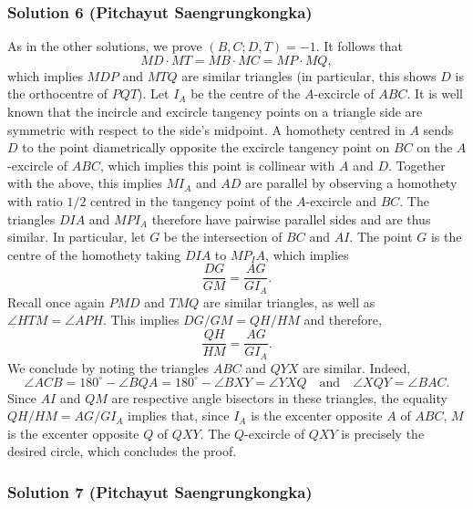 \subsubsection{Solution 6 (Pitchayut Saengrungkongka)}
As in the other solutions, we prove $(B, C; D, T)=-1$. It follows that
$$MD\cdot MT=MB\cdot MC=MP\cdot MQ,$$
which implies $MDP$ and $MTQ$ are similar triangles (in particular, this shows $D$ is the orthocentre of $PQT$).
\nl
Let $I_A$ be the centre of the $A$-excircle of $ABC$. It is well known that the incircle and excircle tangency points on a triangle side are symmetric with respect to the side's midpoint. A homothety centred in $A$ sends $D$ to the point diametrically opposite the excircle tangency point on $BC$ on the $A$-excircle of $ABC$, which implies this point is collinear with $A$ and $D$. Together with the above, this implies $MI_A$ and $AD$ are parallel by observing a homothety with ratio $1/2$ centred in the tangency point of the $A$-excircle and $BC$.\nl
The triangles $DIA$ and $MPI_A$ therefore have pairwise parallel sides and are thus similar. In particular, let $G$ be the intersection of $BC$ and $AI$. The point $G$ is the centre of the homothety taking $DIA$ to $MP_IA$, which implies $$\frac{DG}{GM}=\frac{AG}{GI_A}.$$
Recall once again $PMD$ and $TMQ$ are similar triangles, as well as $\angle HTM=\angle APH$. This implies $DG/GM=QH/HM$ and therefore,
$$\frac{QH}{HM}=\frac{AG}{GI_A}.$$
We conclude by noting the triangles $ABC$ and $QYX$ are similar. Indeed, $$\angle ACB=180^\circ-\angle BQA=180^\circ-\angle BXY=\angle YXQ\quad\text{and}\quad  \angle XQY=\angle BAC.$$
Since $AI$ and $QM$ are respective angle bisectors in these triangles, the equality $QH/HM=AG/GI_A$ implies that, since $I_A$ is the excenter opposite $A$ of $ABC$, $M$ is the excenter opposite $Q$ of $QXY$. The $Q$-excircle of $QXY$ is precisely the desired circle, which concludes the proof.

\subsubsection{Solution 7 (Pitchayut Saengrungkongka)}

